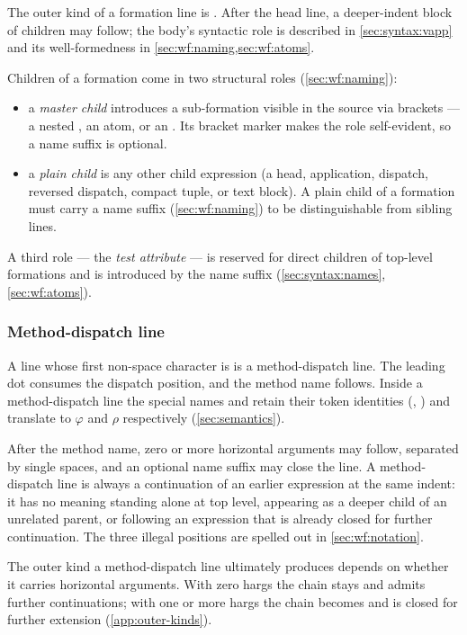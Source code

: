 The outer kind of a formation line is .
After the head line, a deeper-indent block of children may follow;
  the body's syntactic role is described in \cref{sec:syntax:vapp}
  and its well-formedness in \cref{sec:wf:naming,sec:wf:atoms}.

Children of a formation come in two structural roles
  (\cref{sec:wf:naming}):
\begin{itemize}
  \item a \emph{master child} introduces a sub-formation visible in the
    source via brackets --- a nested , an atom, or an
    . Its bracket marker makes the role
    self-evident, so a name suffix is optional.
  \item a \emph{plain child} is any other child expression
    (a head, application, dispatch, reversed dispatch, compact tuple, or
    text block). A plain child of a formation must carry a name suffix
    (\cref{sec:wf:naming}) to be distinguishable from sibling lines.
\end{itemize}
A third role --- the \emph{test attribute} --- is reserved for direct
  children of top-level formations and is introduced by the \ff{+>} name
  suffix (\cref{sec:syntax:names}, \cref{sec:wf:atoms}).

\subsubsection{Method-dispatch line}\label{sec:syntax:method}

A line whose first non-space character is  is a method-dispatch line.
The leading dot consumes the dispatch position, and the method name follows.
Inside a method-dispatch line the special names  and \ff{\textasciicircum}
  retain their token identities (, ) and translate to
  \(\varphi\) and \(\rho\) respectively (\cref{sec:semantics}).

After the method name, zero or more horizontal arguments may follow,
  separated by single spaces, and an optional name suffix may close the line.
A method-dispatch line is always a continuation of an earlier expression
  at the same indent: it has no meaning standing alone at top level,
  appearing as a deeper child of an unrelated parent, or following an
  expression that is already closed for further continuation.
The three illegal positions are spelled out in \cref{sec:wf:notation}.

The outer kind a method-dispatch line ultimately produces depends on whether
  it carries horizontal arguments.
With zero hargs the chain stays  and admits further continuations;
  with one or more hargs the chain becomes  and is
  closed for further extension (\cref{app:outer-kinds}).

